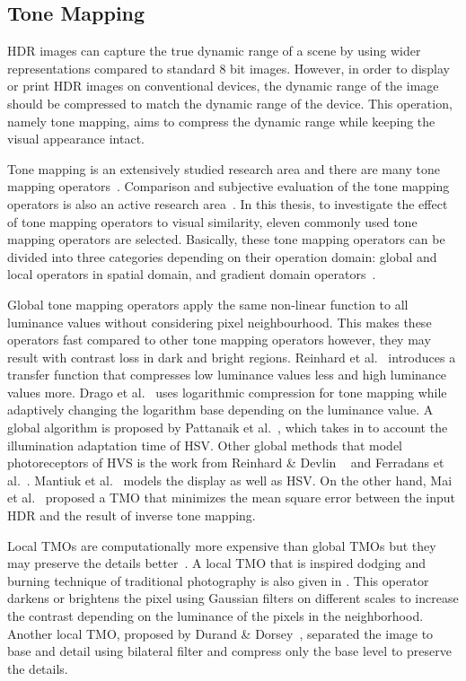 \subsection{Tone Mapping}
HDR images can capture the true dynamic range of a scene by using wider representations compared to standard 8 bit images. However, in order to display or print HDR images on conventional devices, the dynamic range of the image should be compressed to match the dynamic range of the device. This operation, namely tone mapping, aims to compress the dynamic range while keeping the visual appearance intact. 

Tone mapping is an extensively studied research area and there are many tone mapping operators~\cite{Rein2010}. Comparison and subjective evaluation of the tone mapping operators is also an active research area~\cite{kundu2017large, krasula2016preference}. In this thesis, to investigate the effect of tone mapping operators to visual similarity, eleven commonly used tone mapping operators are selected. Basically, these tone mapping operators can be divided into three categories depending on their operation domain: global and local operators in spatial domain, and gradient domain operators~\cite{Rein2010}. 

Global tone mapping operators apply the same non-linear function to all luminance values without considering pixel neighbourhood. This makes these operators fast compared to other tone mapping operators however, they may result with contrast loss in dark and bright regions. Reinhard et al.~\cite{reinhard2002photographic} introduces a transfer function that compresses low luminance values less and high luminance values more. Drago et al.~\cite{drago2003adaptive} uses logarithmic compression for tone mapping while adaptively changing the logarithm base depending on the luminance value. A global algorithm is proposed by Pattanaik et al.~\cite{pattanaik2000time}, which takes in to account the illumination adaptation time of HSV. Other global methods that model photoreceptors of HVS is the work from Reinhard \& Devlin ~\cite{reinhard2005dynamic} and Ferradans et al.~\cite{ferradans2011analysis}. Mantiuk et al.~\cite{mantiuk2008display} models the display as well as HSV. On the other hand, Mai et al.~\cite{mai2010optimizing} proposed a TMO that minimizes the mean square error between the input HDR and the result of inverse tone mapping.

Local TMOs are computationally more expensive than global TMOs but they may preserve the details better~\cite{Rein2010}. A local TMO that is inspired dodging and burning technique of traditional photography is also given in \cite{reinhard2002photographic}. This operator darkens or brightens the pixel using Gaussian filters on different scales to increase the contrast  depending on the luminance of the pixels in the neighborhood. Another local TMO, proposed by Durand \& Dorsey~\cite{durand2002fast}, separated the image to base and detail using bilateral filter and compress only the base level to preserve the details. 

